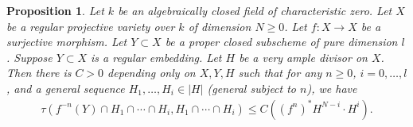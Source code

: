 \documentclass[12pt]{amsart}
\theoremstyle{plain}
\newtheorem{proposition}[theorem]{Proposition}
\theoremstyle{definition}
\numberwithin{equation}{section}
\begin{document}

\begin{proposition}\label{prop:boundoftaudyn}
Let $k$ be an algebraically closed field of characteristic zero.
Let $X$ be a regular projective variety over $k$ of dimension $N \geq 0$.
Let $f \colon X \longrightarrow X$ be a surjective morphism.
Let $Y \subset X$ be a proper closed subscheme of pure dimension $l$.
Suppose $Y \subset X$ is a regular embedding.
Let $H$ be a very ample divisor on $X$.
Then there is $C > 0$ depending only on $X, Y, H$ such that
for any $n \geq 0$, $i=0,\dots, l$, and a general sequence $H_{1}, \dots, H_{i} \in |H|$
(general subject to $n$), we have
\begin{align}
\tau(f^{-n}(Y) \cap H_{1} \cap \cdots \cap H_{i}, H_{1} \cap \cdots \cap H_{i}) \leq C ((f^{n})^{*} H^{N-i} \cdot H^{i}  ).
\end{align}
\end{proposition}
\end{document}
